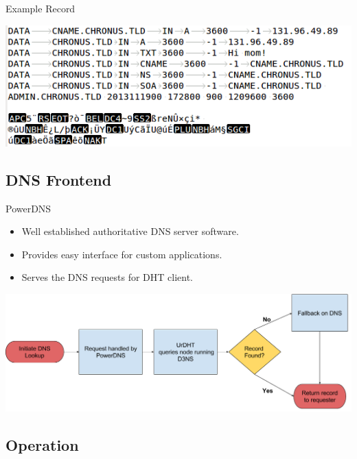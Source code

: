 \documentclass[11pt]{beamer}
\begin{document}
\begin{frame}{Example Record}
	\begin{center}
\includegraphics[width=\linewidth]{figs/record}
\end{center}

\end{frame}



\subsection{DNS Frontend}
\begin{frame}{PowerDNS}
\begin{itemize}
	\item Well established authoritative DNS server software.	
	\item Provides easy interface for custom applications.
	\item Serves the DNS requests for DHT client.
\end{itemize}

	\begin{center}
		\includegraphics[width=\linewidth]{"figs/D3NS Flowchart"}
	\end{center}


	

	
\end{frame}


\subsection{Operation}
\end{document}
